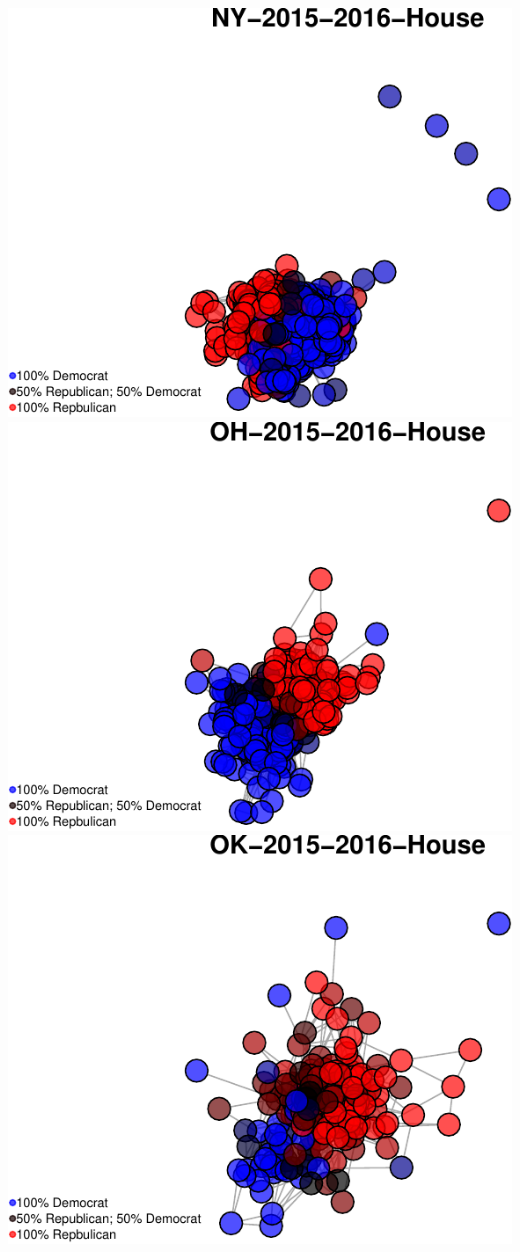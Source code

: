 \documentclass[]{article}
\begin{document}
\includegraphics{Final_Project_RMarkdown_Updated_files/figure-latex/unnamed-chunk-10-28.pdf}
\includegraphics{Final_Project_RMarkdown_Updated_files/figure-latex/unnamed-chunk-10-29.pdf}
\includegraphics{Final_Project_RMarkdown_Updated_files/figure-latex/unnamed-chunk-10-30.pdf}
\end{document}
